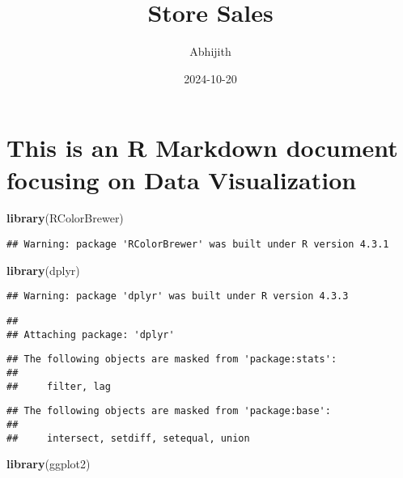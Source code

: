 \documentclass[
]{article}
\title{Store Sales}
\author{Abhijith}
\date{2024-10-20}
\newenvironment{Shaded}{\begin{snugshade}}{\end{snugshade}}
\newcommand{\FunctionTok}[1]{\textcolor[rgb]{0.13,0.29,0.53}{\textbf{#1}}}
\newcommand{\NormalTok}[1]{#1}
\begin{document}
\maketitle

\hypertarget{this-is-an-r-markdown-document-focusing-on-data-visualization}{%
\section{This is an R Markdown document focusing on Data
Visualization}\label{this-is-an-r-markdown-document-focusing-on-data-visualization}}

\begin{Shaded}
\begin{Highlighting}[]
\FunctionTok{library}\NormalTok{(RColorBrewer)}
\end{Highlighting}
\end{Shaded}

\begin{verbatim}
## Warning: package 'RColorBrewer' was built under R version 4.3.1
\end{verbatim}

\begin{Shaded}
\begin{Highlighting}[]
\FunctionTok{library}\NormalTok{(dplyr)}
\end{Highlighting}
\end{Shaded}

\begin{verbatim}
## Warning: package 'dplyr' was built under R version 4.3.3
\end{verbatim}

\begin{verbatim}
## 
## Attaching package: 'dplyr'
\end{verbatim}

\begin{verbatim}
## The following objects are masked from 'package:stats':
## 
##     filter, lag
\end{verbatim}

\begin{verbatim}
## The following objects are masked from 'package:base':
## 
##     intersect, setdiff, setequal, union
\end{verbatim}

\begin{Shaded}
\begin{Highlighting}[]
\FunctionTok{library}\NormalTok{(ggplot2)}
\end{Highlighting}
\end{Shaded}
\end{document}
